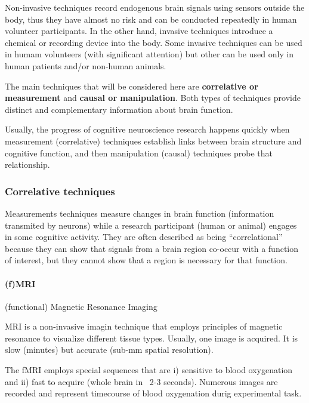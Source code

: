 \documentclass[12pt,article,oneside,a4paper]{memoir}
\begin{document}
Non-invasive techniques record endogenous brain signals using sensors outside
the body, thus they have almost no risk and can be conducted repeatedly in
human volunteer participants. In the other hand, invasive techniques introduce
a chemical or recording device into the body. Some invasive techniques can be
used in humam volunteers (with significant attention) but other can be used
only in human patients and/or non-human animals.

The main techniques that will be considered here are \textbf{correlative or
measurement} and \textbf{causal or manipulation}. Both types of techniques
provide distinct and complementary information about brain function.

Usually, the progress of cognitive neuroscience research happens quickly when
measurement (correlative) techniques establish links between brain structure
and cognitive function, and then manipulation (causal) techniques probe that
relationship.

\subsubsection{Correlative techniques}

Measurements techniques measure changes in brain function (information
transmited by neurons) while a research participant (human or animal) engages
in some cognitive activity. They are often described as being ``correlational''
because they can show that signals from a brain region co-occur with a function
of interest, but they cannot show that a region is necessary for that function.

\paragraph{(f)MRI} (functional) Magnetic Resonance Imaging

MRI is a non-invasive imagin technique that employs principles of magnetic
resonance to visualize different tissue types. Usually, one image is acquired.
It is slow (minutes) but accurate (sub-mm spatial resolution).

The fMRI employs special sequences that are i) sensitive to blood oxygenation
and ii) fast to acquire (whole brain in ~2-3 seconds). Numerous images are
recorded and represent timecourse of blood oxygenation durig experimental task.
\end{document}
